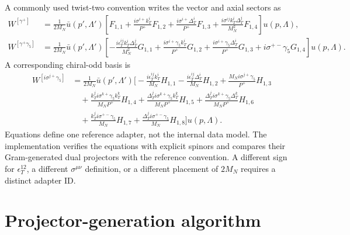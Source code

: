 \documentclass[11pt]{article}
\begin{document}
A commonly used twist-two convention writes the vector and axial sectors as
\cite{Meissner2009}
\begin{align}
 W^{[\gamma^+]}
 &=\frac{1}{2M_N}\bar u(p',\Lambda')
 \left[
 F_{1,1}
 +\frac{i\sigma^{i+}k_T^i}{P^+}F_{1,2}
 +\frac{i\sigma^{i+}\Delta_T^i}{P^+}F_{1,3}
 +\frac{i\sigma^{ij}k_T^i\Delta_T^j}{M_N^2}F_{1,4}
 \right]u(p,\Lambda),
\label{eq:mms-vector-adapter}\\
 W^{[\gamma^+\gamma_5]}
 &=\frac{1}{2M_N}\bar u(p',\Lambda')
 \left[
 -\frac{i\epsilon_T^{ij}k_T^i\Delta_T^j}{M_N^2}G_{1,1}
 +\frac{i\sigma^{i+}\gamma_5 k_T^i}{P^+}G_{1,2}
 +\frac{i\sigma^{i+}\gamma_5\Delta_T^i}{P^+}G_{1,3}
 +i\sigma^{+-}\gamma_5G_{1,4}
 \right]u(p,\Lambda).
\label{eq:mms-axial-adapter}
\end{align}
A corresponding chiral-odd basis is
\begin{align}
 W^{[i\sigma^{j+}\gamma_5]}
 &=\frac{1}{2M_N}\bar u(p',\Lambda')
 \Bigg[
 -\frac{i\epsilon_T^{ij}k_T^i}{M_N}H_{1,1}
 -\frac{i\epsilon_T^{ij}\Delta_T^i}{M_N}H_{1,2}
 +\frac{M_N i\sigma^{j+}\gamma_5}{P^+}H_{1,3}
\nonumber\\
 &\quad
 +\frac{k_T^j i\sigma^{k+}\gamma_5k_T^k}{M_NP^+}H_{1,4}
 +\frac{\Delta_T^j i\sigma^{k+}\gamma_5k_T^k}{M_NP^+}H_{1,5}
 +\frac{\Delta_T^j i\sigma^{k+}\gamma_5\Delta_T^k}{M_NP^+}H_{1,6}
\nonumber\\
 &\quad
 +\frac{k_T^j i\sigma^{+-}\gamma_5}{M_N}H_{1,7}
 +\frac{\Delta_T^j i\sigma^{+-}\gamma_5}{M_N}H_{1,8}
 \Bigg]u(p,\Lambda).
\label{eq:mms-tensor-adapter}
\end{align}
Equations
 define one
reference adapter, not the internal data model.  The implementation verifies
the equations with explicit spinors and compares their Gram-generated dual
projectors with the reference convention.  A different sign for
\(\epsilon_T^{12}\), a different \(\sigma^{\mu\nu}\) definition, or a
different placement of \(2M_N\) requires a distinct adapter ID.

\section{Projector-generation algorithm}
\label{app:projector-algorithm}
\end{document}
